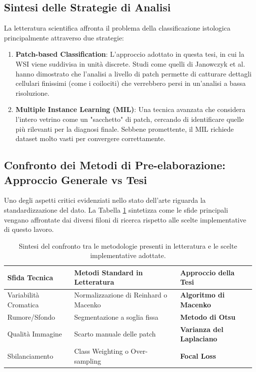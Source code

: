 \subsection{Sintesi delle Strategie di Analisi}
La letteratura scientifica affronta il problema della classificazione istologica principalmente attraverso due strategie:
\begin{enumerate}
	\item \textbf{Patch-based Classification}: L'approccio adottato in questa tesi, in cui la WSI viene suddivisa in unità discrete. Studi come quelli di Janowczyk et al. \cite{janowczyk2016deep} hanno dimostrato che l'analisi a livello di patch permette di catturare dettagli cellulari finissimi (come i coilociti) che verrebbero persi in un'analisi a bassa risoluzione.
	\item \textbf{Multiple Instance Learning (MIL)}: Una tecnica avanzata che considera l'intero vetrino come un "sacchetto" di patch, cercando di identificare quelle più rilevanti per la diagnosi finale. Sebbene promettente, il MIL richiede dataset molto vasti per convergere correttamente.
\end{enumerate}

\subsection{Confronto dei Metodi di Pre-elaborazione: Approccio Generale vs Tesi}
Uno degli aspetti critici evidenziati nello stato dell'arte riguarda la standardizzazione del dato. La Tabella \ref{tab:stato_arte} sintetizza come le sfide principali vengano affrontate dai diversi filoni di ricerca rispetto alle scelte implementative di questo lavoro.

\begin{table}[htbp]
	\centering
	\small 
	\renewcommand{\arraystretch}{1.5} 
	\begin{tabular*}{\textwidth}{@{\extracolsep{\fill}} l l l @{}}
		\toprule
		\textbf{Sfida Tecnica} & \textbf{Metodi Standard in Letteratura} & \textbf{Approccio della Tesi} \\
		\midrule
		Variabilità Cromatica & Normalizzazione di Reinhard o Macenko & \textbf{Algoritmo di Macenko} \\
		Rumore/Sfondo         & Segmentazione a soglia fissa            & \textbf{Metodo di Otsu} \\
		Qualità Immagine      & Scarto manuale delle patch              & \textbf{Varianza del Laplaciano} \\
		Sbilanciamento        & Class Weighting o Over-sampling         & \textbf{Focal Loss} \\
		\bottomrule
	\end{tabular*}
	\caption{Sintesi del confronto tra le metodologie presenti in letteratura e le scelte implementative adottate.}
	\label{tab:stato_arte}
\end{table}

